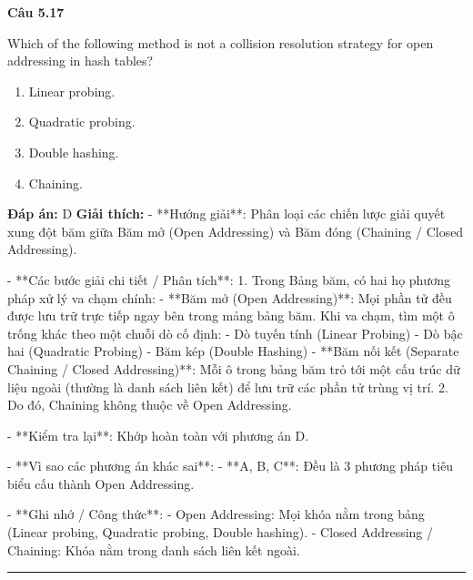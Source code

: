 \documentclass[11pt,a4paper]{article}
\newenvironment{question}[1]{%
  \par\vspace{1em}\noindent\textbf{\large Câu #1}\par\vspace{0.4em}
}{%
  \par\vspace{1em}\hrule\vspace{0.6em}
}
\newenvironment{choices}{%
  \begin{enumerate}[label=\textbf{\Alph*.},leftmargin=2.2em,itemsep=2pt,topsep=3pt]
}{%
  \end{enumerate}
}
\newcommand{\choice}{\item}
\begin{document}
\begin{question}{5.17}
Which of the following method is not a collision resolution strategy for open addressing in hash tables?
\begin{choices}
\choice Linear probing.
\choice Quadratic probing.
\choice Double hashing.
\choice Chaining.
\end{choices}
\textbf{Đáp án:} D
\textbf{Giải thích:} - **Hướng giải**:
  Phân loại các chiến lược giải quyết xung đột băm giữa Băm mở (Open Addressing) và Băm đóng (Chaining / Closed Addressing).

- **Các bước giải chi tiết / Phân tích**:
  1. Trong Bảng băm, có hai họ phương pháp xử lý va chạm chính:
     - **Băm mở (Open Addressing)**: Mọi phần tử đều được lưu trữ trực tiếp ngay bên trong mảng bảng băm. Khi va chạm, tìm một ô trống khác theo một chuỗi dò cố định:
       - Dò tuyến tính (Linear Probing)
       - Dò bậc hai (Quadratic Probing)
       - Băm kép (Double Hashing)
     - **Băm nối kết (Separate Chaining / Closed Addressing)**: Mỗi ô trong bảng băm trỏ tới một cấu trúc dữ liệu ngoài (thường là danh sách liên kết) để lưu trữ các phần tử trùng vị trí.
  2. Do đó, Chaining không thuộc về Open Addressing.

- **Kiểm tra lại**:
  Khớp hoàn toàn với phương án D.

- **Vì sao các phương án khác sai**:
  - **A, B, C**: Đều là 3 phương pháp tiêu biểu cấu thành Open Addressing.

- **Ghi nhớ / Công thức**:
  - Open Addressing: Mọi khóa nằm trong bảng (Linear probing, Quadratic probing, Double hashing).
  - Closed Addressing / Chaining: Khóa nằm trong danh sách liên kết ngoài.
\end{question}
\end{document}
